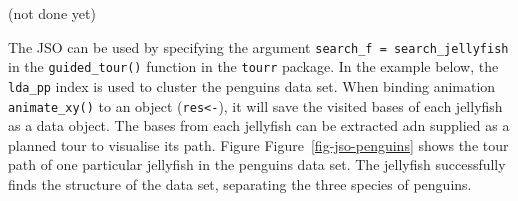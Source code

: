 \documentclass[
  12pt,
]{interact}
\newenvironment{Shaded}{\begin{snugshade}}{\end{snugshade}}
\newcommand{\AttributeTok}[1]{\textcolor[rgb]{0.40,0.45,0.13}{#1}}
\newcommand{\CommentTok}[1]{\textcolor[rgb]{0.37,0.37,0.37}{#1}}
\newcommand{\DecValTok}[1]{\textcolor[rgb]{0.68,0.00,0.00}{#1}}
\newcommand{\FloatTok}[1]{\textcolor[rgb]{0.68,0.00,0.00}{#1}}
\newcommand{\FunctionTok}[1]{\textcolor[rgb]{0.28,0.35,0.67}{#1}}
\newcommand{\NormalTok}[1]{\textcolor[rgb]{0.00,0.23,0.31}{#1}}
\newcommand{\OtherTok}[1]{\textcolor[rgb]{0.00,0.23,0.31}{#1}}
\newcommand{\SpecialCharTok}[1]{\textcolor[rgb]{0.37,0.37,0.37}{#1}}
\theoremstyle{plain}
\begin{document}
(not done yet)

The JSO can be used by specifying the argument
\texttt{search\_f\ =\ search\_jellyfish} in the \texttt{guided\_tour()}
function in the \texttt{tourr} package. In the example below, the
\texttt{lda\_pp} index is used to cluster the penguins data set. When
binding animation \texttt{animate\_xy()} to an object
(\texttt{res\textless{}-}), it will save the visited bases of each
jellyfish as a data object. The bases from each jellyfish can be
extracted adn supplied as a planned tour to visualise its path. Figure
Figure~\ref{fig-jso-penguins} shows the tour path of one particular
jellyfish in the penguins data set. The jellyfish successfully finds the
structure of the data set, separating the three species of penguins.

\begin{Shaded}
\end{Shaded}
\end{document}
